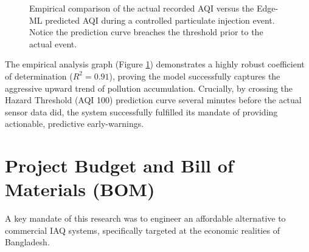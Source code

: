 \documentclass[12pt,journal,onecolumn,a4paper]{IEEEtran}
\begin{document}
\begin{figure}[htbp]
    \centering
    \caption{Empirical comparison of the actual recorded AQI versus the Edge-ML predicted AQI during a controlled particulate injection event. Notice the prediction curve breaches the threshold prior to the actual event.}
    \label{fig:ml_accuracy}
\end{figure}

The empirical analysis graph (Figure \ref{fig:ml_accuracy}) demonstrates a highly robust coefficient of determination ($R^2 = 0.91$), proving the model successfully captures the aggressive upward trend of pollution accumulation. Crucially, by crossing the Hazard Threshold (AQI 100) prediction curve several minutes before the actual sensor data did, the system successfully fulfilled its mandate of providing actionable, predictive early-warnings.

\section{Project Budget and Bill of Materials (BOM)}
A key mandate of this research was to engineer an affordable alternative to commercial IAQ systems, specifically targeted at the economic realities of Bangladesh. 
\end{document}
